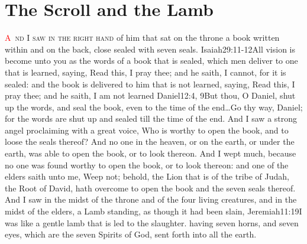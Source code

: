 \chapter{The Scroll and the Lamb}
\lettrine[lines=3,slope=0.5em]{\textcolor{red}{A}}{\ nd I saw in the right hand} of him that sat on the throne a book written within and on the back, close sealed with seven seals.%
 					{Isaiah}{29:11-12}{All vision is become unto you as the words of a book that is sealed, which men deliver to one that is learned, saying, Read this, I pray thee; and he saith, I cannot, for it is sealed: and the book is delivered to him that is not learned, saying, Read this, I pray thee; and he saith, I am not learned}%
 					{Daniel}{12:4, 9}{But thou, O Daniel, shut up the words, and seal the book, even to the time of the end\ldots Go thy way, Daniel; for the words are shut up and sealed till the time of the end.} %
And I saw a strong angel proclaiming with a great voice, Who is worthy to open the book, and to loose the seals thereof? %
And no one in the heaven, or on the earth, or under the earth, was able to open the book, or to look thereon. %
And I wept much, because no one was found worthy to open the book, or to look thereon: %
and one of the elders saith unto me, Weep not; behold, the Lion that is of the tribe of Judah,%
the Root of David,%
hath overcome to open the book and the seven seals thereof. %
And I saw in the midst of the throne and of the four living creatures, and in the midst of the elders, a Lamb standing, as though it had been slain,%
					  {Jeremiah}{11:19}{I was like a gentle lamb that is led to the slaughter.} %
having seven horns, and seven eyes, which are the seven Spirits of God, sent forth into all the earth.%

